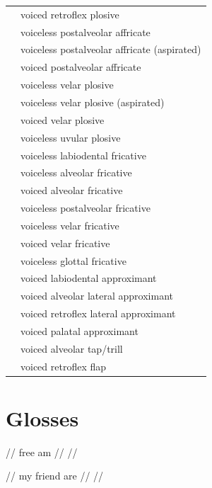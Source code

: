 \documentclass{article}
\begin{document}
\begin{xltabular}{\textwidth}{lL}
   & voiced retroflex plosive \\
   & voiceless postalveolar affricate \\
   & voiceless postalveolar affricate (aspirated) \\
   & voiced postalveolar affricate \\
   & voiceless velar plosive \\
   & voiceless velar plosive (aspirated) \\
   & voiced velar plosive \\
   & voiceless uvular plosive \\
   & voiceless labiodental fricative \\
   & voiceless alveolar fricative \\
   & voiced alveolar fricative \\
   & voiceless postalveolar fricative \\
   & voiceless velar fricative \\
   & voiced velar fricative \\
   & voiceless glottal fricative \\
   & voiced labiodental approximant \\
   & voiced alveolar lateral approximant \\
   & voiced retroflex lateral approximant \\
   & voiced palatal approximant \\
   & voiced alveolar tap/trill \\
   & voiced retroflex flap \\
\end{xltabular}

\newpage\section{Glosses}

\ex
\begingl
\gla {}   //
 free am //
 //
\endgl
\xe

\ex
\begingl
\gla {}   \ipa{\ae:} //
 my friend are //
 //
\endgl
\xe
\end{document}
